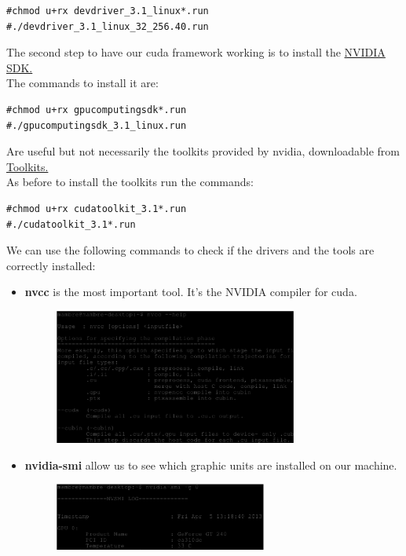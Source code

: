 \documentclass[a4paper,13pt]{article}
\begin{document}
\begin{multicols}{2}
\begin{lstlisting}
#chmod u+rx devdriver_3.1_linux*.run
#./devdriver_3.1_linux_32_256.40.run
\end{lstlisting}
    The second step to have our cuda framework working is to install the \href{https://mega.co.nz/#!d1FD0TiS!PusMUXIuLJzxiM_hh4ABi1ltWvAIARZutZR3wIR4TEU}{NVIDIA SDK.}\\
    The commands to install it are:
\begin{lstlisting}
#chmod u+rx gpucomputingsdk*.run
#./gpucomputingsdk_3.1_linux.run
\end{lstlisting}
    Are useful but not necessarily the toolkits provided by nvidia, downloadable from \href{https://mega.co.nz/#!88kFCCJL!FmqUdQHY0VE00V5aQOcTQRuaufw9bZ6AS7ZyfQGXiSc} {Toolkits.}\\
    As before to install the toolkits run the commands:
\begin{lstlisting}
#chmod u+rx cudatoolkit_3.1*.run
#./cudatoolkit_3.1*.run
\end{lstlisting}
    We can use the following commands to check if the drivers and the tools are correctly installed:
    \begin{itemize}
        \item{{\bf nvcc} is the most important tool. It's the NVIDIA compiler for cuda.}
            \begin{figure}[H]
                \includegraphics[width=8cm]{eps/nvcc.eps}
            \end{figure}
        \item{{\bf nvidia-smi} allow us to see which graphic units are installed on our machine.}
            \begin{figure}[H]
                \includegraphics[width=7cm]{eps/nvidia-smi.eps}
            \end{figure}

\end{itemize}
\end{multicols}
\end{document}
